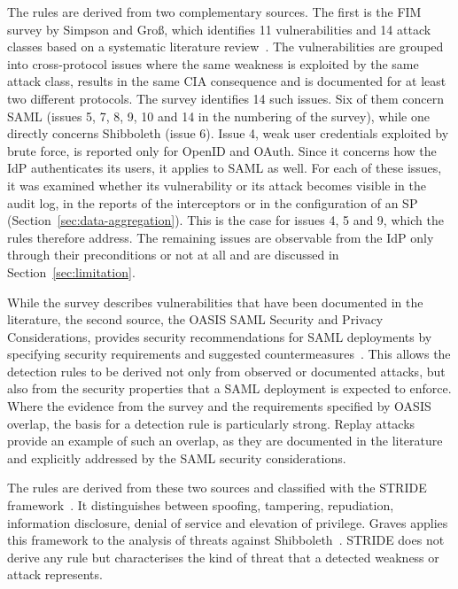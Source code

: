 \documentclass[../main.tex]{subfiles}
\begin{document}
The rules are derived from two complementary sources. 
The first is the FIM survey by Simpson and Groß, which identifies 11 vulnerabilities and 14 attack 
classes based on a systematic literature review~\cite{FIMSurvey}. 
The vulnerabilities are grouped into cross-protocol issues where the same weakness is exploited 
by the same attack class, results in the same CIA consequence and is documented for at least 
two different protocols. 
The survey identifies 14 such issues. 
Six of them concern SAML (issues 5, 7, 8, 9, 10 and 14 in the numbering of the survey), while 
one directly concerns Shibboleth (issue 6). 
Issue 4, weak user credentials exploited by brute force, is reported only for OpenID and OAuth. 
Since it concerns how the IdP authenticates its users, it applies to SAML as well. 
For each of these issues, it was examined whether its vulnerability or its attack becomes visible 
in the audit log, in the reports of the interceptors or in the configuration of an 
SP (Section~\ref{sec:data-aggregation}). 
This is the case for issues 4, 5 and 9, which the rules therefore address. 
The remaining issues are observable from the IdP only through their preconditions or not at all 
and are discussed in Section~\ref{sec:limitation}. 

While the survey describes vulnerabilities that have been documented in the literature, the 
second source, the OASIS SAML Security and Privacy Considerations, provides security recommendations 
for SAML deployments by specifying security requirements and suggested 
countermeasures~\cite{SAMLSecurityConsideration}. 
This allows the detection rules to be derived not only from observed or documented attacks, 
but also from the security properties that a SAML deployment is expected to enforce.
Where the evidence from the survey and the requirements specified by OASIS overlap, the basis 
for a detection rule is particularly strong. 
Replay attacks provide an example of such an overlap, as they are documented in the literature 
and explicitly addressed by the SAML security considerations. 

The rules are derived from these two sources and classified with the STRIDE framework~\cite{ThreatModeling}. 
It distinguishes between spoofing, tampering, repudiation, information disclosure, denial 
of service and elevation of privilege. 
Graves applies this framework to the analysis of threats against Shibboleth~\cite{ShibbolethGIAC}. 
STRIDE does not derive any rule but characterises the kind of threat that a detected weakness or 
attack represents. 
\end{document}

